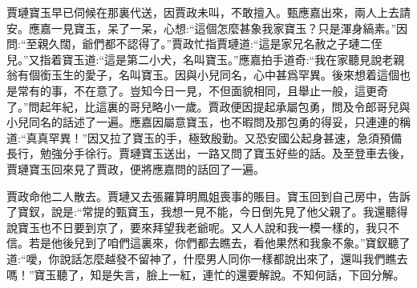 \begin{parag}
    賈璉寶玉早已伺候在那裏代送，因賈政未叫，不敢擅入。甄應嘉出來，兩人上去請安。應嘉一見寶玉，呆了一呆，心想:“這個怎麼甚象我家寶玉？只是渾身縞素。”因問:“至親久闊，爺們都不認得了。”賈政忙指賈璉道:“這是家兄名赦之子璉二侄兒。”又指着寶玉道:“這是第二小犬，名叫寶玉。”應嘉拍手道奇:“我在家聽見說老親翁有個銜玉生的愛子，名叫寶玉。因與小兒同名，心中甚爲罕異。後來想着這個也是常有的事，不在意了。豈知今日一見，不但面貌相同，且舉止一般，這更奇了。”問起年紀，比這裏的哥兒略小一歲。賈政便因提起承屬包勇，問及令郎哥兒與小兒同名的話述了一遍。應嘉因屬意寶玉，也不暇問及那包勇的得妥，只連連的稱道:“真真罕異！”因又拉了寶玉的手，極致殷勤。又恐安國公起身甚速，急須預備長行，勉強分手徐行。賈璉寶玉送出，一路又問了寶玉好些的話。及至登車去後，賈璉寶玉回來見了賈政，便將應嘉問的話回了一遍。
\end{parag}


\begin{parag}
    賈政命他二人散去。賈璉又去張羅算明鳳姐喪事的賬目。寶玉回到自己房中，告訴了寶釵，說是:“常提的甄寶玉，我想一見不能，今日倒先見了他父親了。我還聽得說寶玉也不日要到京了，要來拜望我老爺呢。又人人說和我一模一樣的，我只不信。若是他後兒到了咱們這裏來，你們都去瞧去，看他果然和我象不象。”寶釵聽了道:“噯，你說話怎麼越發不留神了，什麼男人同你一樣都說出來了，還叫我們瞧去嗎！”寶玉聽了，知是失言，臉上一紅，連忙的還要解說。不知何話，下回分解。
\end{parag}